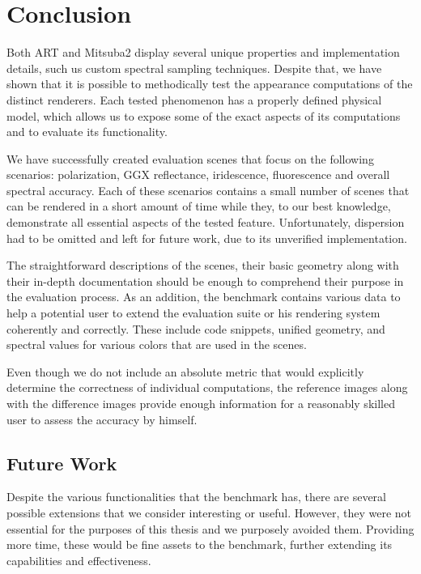 \chapter*{Conclusion}

Both ART and Mitsuba2 display several unique properties and implementation details, such us custom spectral sampling techniques. Despite that, we have shown that it is possible to methodically test the appearance computations of the distinct renderers. Each tested phenomenon has a properly defined physical model, which allows us to expose some of the exact aspects of its computations and to evaluate its functionality.

We have successfully created evaluation scenes that focus on the following scenarios: polarization, GGX reflectance, iridescence, fluorescence and overall spectral accuracy. Each of these scenarios contains a small number of scenes that can be rendered in a short amount of time while they, to our best knowledge, demonstrate all essential aspects of the tested feature. Unfortunately, dispersion had to be omitted and left for future work, due to its unverified implementation.

The straightforward descriptions of the scenes, their basic geometry along with their in-depth documentation should be enough to comprehend their purpose in the evaluation process. As an addition, the benchmark contains various data to help a potential user to extend the evaluation suite or his rendering system coherently and correctly. These include code snippets, unified geometry, and spectral values for various colors that are used in the scenes.

Even though we do not include an absolute metric that would explicitly determine the correctness of individual computations, the reference images along with the difference images provide enough information for a reasonably skilled user to assess the accuracy by himself.

\section{Future Work}

Despite the various functionalities that the benchmark has, there are several possible extensions that we consider interesting or useful. However, they were not essential for the purposes of this thesis and we purposely avoided them. Providing more time, these would be fine assets to the benchmark, further extending its capabilities and effectiveness.

